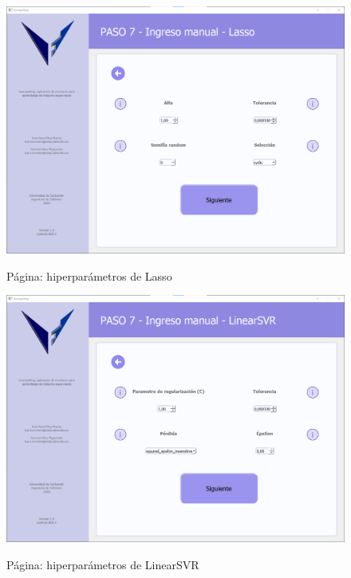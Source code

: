\begin{figure}[H]
    \centering
    \caption{Página: hiperparámetros de Lasso}
    \includegraphics[width=\textwidth]{images/lasso.png}
    \label{fig:lasso}
\end{figure}

\begin{figure}[H]
    \centering
    \caption{Página: hiperparámetros de LinearSVR}
    \includegraphics[width=\textwidth]{images/linearsvr.png}
    \label{fig:linearsvr}
\end{figure}

